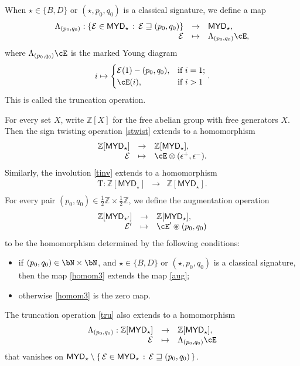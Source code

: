 \documentclass[11pt,a4paper]{amsart}
\def\MYD{{\mathsf{MYD}}}
\newcommand{\CE}{{\mathcal {E}}}
\newcommand{\Z}{\mathbb{Z}}
\newcommand{\be}{\begin {equation}}
\newcommand{\ee}{\end {equation}}
\numberwithin{equation}{section}
\theoremstyle{remark}
\def\MYD{{\mathsf{MYD}}}
\def\lotimes{\otimes}
\begin{document}
 When $\star\in \{B,D\}$ or  
$ (\star,p_{0},q_{0})$ is a classical signature, we define a map
\be\label{tru}
 \begin{array}{rcl}
 \Lambda_{(p_0,q_0)}: \{\CE\in \MYD_{\star}\,:\,\CE\sqsupseteq (p_{0},q_{0})\} &\rightarrow & \MYD_{\star},\\
  \CE&\mapsto & \Lambda_{(p_0,q_0)}\cE, 
  \end{array}
\ee
where $\Lambda_{(p_0,q_0)}\cE$ is the marked Young diagram 
\[
i\mapsto \begin{cases}
    \CE(1)-(p_{0},q_{0}), & \text{if } i=1;\\
    \cE(i), & \text{if } i>1
  \end{cases}.
  \]
This is called the truncation operation. 


For every set $X$, write $\Z[X]$ for the free abelian group with free generators $X$. Then the sign twisting operation \eqref{stwist}
extends to a homomorphism 
\be\label{homom1}
\begin{array}{rcl}
  \Z[\MYD_{\star}]&\rightarrow&\Z[\MYD_{\star}], \\
   \CE&\mapsto &\cE \lotimes(\epsilon^{+},\epsilon^{-}).
   \end{array}
\ee
Similarly, the involution 
\eqref{tinv} extends to a homomorphism 
\be\label{homom2}
\begin{array}{rcl}
\mathrm T:   \Z[\MYD_{\star}]&\rightarrow&\Z[\MYD_{\star}]. \\
   \end{array}
\ee
For every pair $(p_0,q_0)\in \frac{1}{2}\Z\times \frac{1}{2}\Z$, we define the augmentation operation  
\be\label{homom3}
\begin{array}{rcl}
  \Z[\MYD_{\star'}]&\rightarrow&\Z[\MYD_{\star}], \\
   \CE'&\mapsto &\cE' \circledast (p_0,q_0)
   \end{array}
\ee
to be the homomorphism determined by the following conditions: 
\begin{itemize}
    \item if $(p_{0},q_{0})\in \bN\times \bN$, and $\star\in \{B,D\}$ or  
$ (\star,p_{0},q_{0})$ is a classical signature, then the map \eqref{homom3} extends the map \eqref{aug};
\item
otherwise  \eqref{homom3} is the zero map. 
\end{itemize}
The truncation operation \eqref{tru} also 
extends to a  homomorphism
\be\label{homom4}
 \begin{array}{rcl}
 \Lambda_{(p_0,q_0)}: \Z[\MYD_{\star}] &\rightarrow & \Z[\MYD_{\star}],\\
  \CE&\mapsto & \Lambda_{(p_0,q_0)}\cE
  \end{array}
\ee
that  vanishes on $\MYD_\star\setminus \set{\CE\in \MYD_{\star}\,:\,\CE\sqsupseteq (p_{0},q_{0})}$. 
\end{document}
